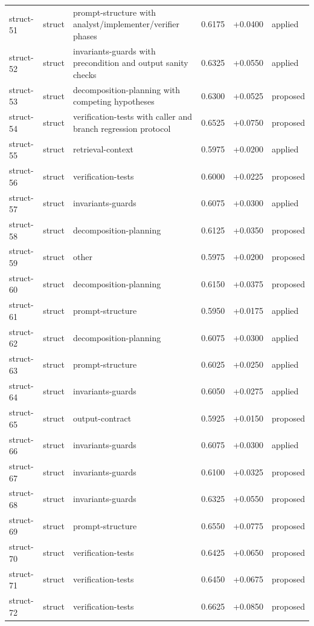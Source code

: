 \begin{center}
\begin{longtable}{llp{5.2cm}rrl}
struct-51 & struct & prompt-structure with analyst/implementer/verifier phases & 0.6175 & +0.0400 & applied \\
struct-52 & struct & invariants-guards with precondition and output sanity checks & 0.6325 & +0.0550 & applied \\
struct-53 & struct & decomposition-planning with competing hypotheses & 0.6300 & +0.0525 & proposed \\
struct-54 & struct & verification-tests with caller and branch regression protocol & 0.6525 & +0.0750 & proposed \\
struct-55 & struct & retrieval-context & 0.5975 & +0.0200 & applied \\
struct-56 & struct & verification-tests & 0.6000 & +0.0225 & proposed \\
struct-57 & struct & invariants-guards & 0.6075 & +0.0300 & applied \\
struct-58 & struct & decomposition-planning & 0.6125 & +0.0350 & proposed \\
struct-59 & struct & other & 0.5975 & +0.0200 & proposed \\
struct-60 & struct & decomposition-planning & 0.6150 & +0.0375 & proposed \\
struct-61 & struct & prompt-structure & 0.5950 & +0.0175 & applied \\
struct-62 & struct & decomposition-planning & 0.6075 & +0.0300 & applied \\
struct-63 & struct & prompt-structure & 0.6025 & +0.0250 & applied \\
struct-64 & struct & invariants-guards & 0.6050 & +0.0275 & applied \\
struct-65 & struct & output-contract & 0.5925 & +0.0150 & proposed \\
struct-66 & struct & invariants-guards & 0.6075 & +0.0300 & applied \\
struct-67 & struct & invariants-guards & 0.6100 & +0.0325 & proposed \\
struct-68 & struct & invariants-guards & 0.6325 & +0.0550 & proposed \\
struct-69 & struct & prompt-structure & 0.6550 & +0.0775 & proposed \\
struct-70 & struct & verification-tests & 0.6425 & +0.0650 & proposed \\
struct-71 & struct & verification-tests & 0.6450 & +0.0675 & proposed \\
struct-72 & struct & verification-tests & 0.6625 & +0.0850 & proposed \\

\end{longtable}
\end{center}
